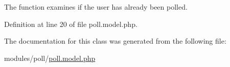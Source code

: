 The function examines if the user has already been polled. 



Definition at line 20 of file poll.\+model.\+php.



The documentation for this class was generated from the following file\+:\begin{DoxyCompactItemize}
\item 
modules/poll/\hyperlink{poll_8model_8php}{poll.\+model.\+php}\end{DoxyCompactItemize}
